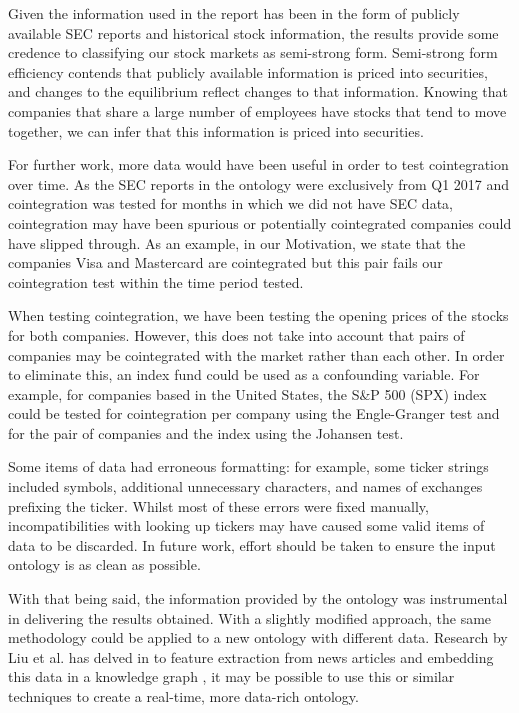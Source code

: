 \documentclass{UoYCSproject}
\begin{document}
Given the information used in the report has been in the form of publicly available SEC reports and historical stock information, the results provide some credence to classifying our stock markets as semi-strong form. Semi-strong form efficiency contends that publicly available information is priced into securities, and changes to the equilibrium reflect changes to that information. Knowing that companies that share a large number of employees have stocks that tend to move together, we can infer that this information is priced into securities.

For further work, more data would have been useful in order to test cointegration over time. As the SEC reports in the ontology were exclusively from Q1 2017 and cointegration was tested for months in which we did not have SEC data, cointegration may have been spurious or potentially cointegrated companies could have slipped through. As an example, in our Motivation, we state that the companies Visa and Mastercard are cointegrated but this pair fails our cointegration test within the time period tested.

When testing cointegration, we have been testing the opening prices of the stocks for both companies. However, this does not take into account that pairs of companies may be cointegrated with the market rather than each other. In order to eliminate this, an index fund could be used as a confounding variable. For example, for companies based in the United States, the S\&P 500 (SPX) index could be tested for cointegration per company using the Engle-Granger test and for the pair of companies and the index using the Johansen test.

Some items of data had erroneous formatting: for example, some ticker strings included symbols, additional unnecessary characters, and names of exchanges prefixing the ticker. Whilst most of these errors were fixed manually, incompatibilities with looking up tickers may have caused some valid items of data to be discarded. In future work, effort should be taken to ensure the input ontology is as clean as possible.

With that being said, the information provided by the ontology was instrumental in delivering the results obtained. With a slightly modified approach, the same methodology could be applied to a new ontology with different data. Research by Liu et al. has delved in to feature extraction from news articles and embedding this data in a knowledge graph \parencite{deeplearning}, it may be possible to use this or similar techniques to create a real-time, more data-rich ontology.
\end{document}
